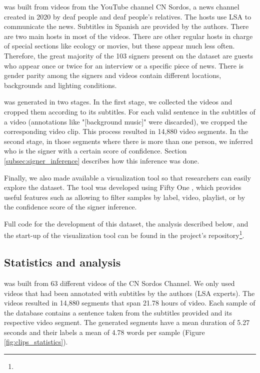 \dbname was built from videos from the YouTube channel CN Sordos, a news channel created in 2020 by deaf people and deaf people's relatives. The hosts use LSA to communicate the news. Subtitles in Spanish are provided by the authors. There are two main hosts in most of the videos. There are other regular hosts in charge of special sections like ecology or movies, but these appear much less often. Therefore, the great majority of the 103 signers present on the dataset are guests who appear once or twice for an interview or a specific piece of news. There is gender parity among the signers and videos contain different locations, backgrounds and lighting conditions.

\dbname was generated in two stages. In the first stage, we collected the videos and cropped them according to its subtitles. For each valid sentence in the subtitles of a video (annotations like "[background music]" were discarded), we cropped the corresponding video clip. This process resulted in 14,880 video segments. In the second stage, in those segments where there is more than one person, we inferred who is the signer with a certain score of confidence. Section \ref{subsec:signer_inference} describes how this inference was done. 

Finally, we also made available a visualization tool so that researchers can easily explore the dataset. The tool was developed using Fifty One \cite{moore2020fiftyone}, which provides useful features such as allowing to filter samples by label, video, playlist, or by the confidence score of the signer inference.

Full code for the development of this dataset, the analysis described below, and the start-up of the visualization tool can be found in the project's repository\footnote{\dbrepourl}.

\subsection{Statistics and analysis}\label{subsec:stats}

\dbname was built from 63 different videos of the CN Sordos Channel. We only used videos that had been annotated with subtitles by the authors (LSA experts). The videos resulted in 14,880 segments that span 21.78 hours of video. Each sample of the database contains a sentence taken from the subtitles provided and its respective video segment. The generated segments have a mean duration of 5.27 seconds and their labels a mean of 4.78 words per sample (Figure \ref{fig:clips_statistics}).

